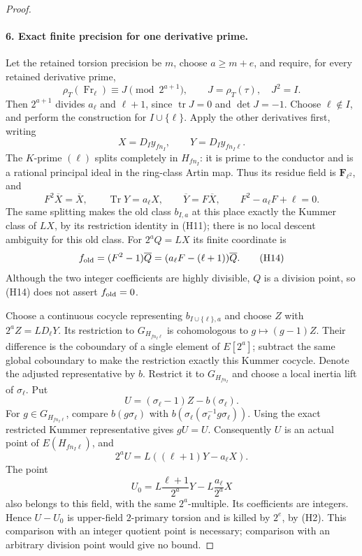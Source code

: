 \documentclass[11pt]{article}
\theoremstyle{definition}
\theoremstyle{remark}
\begin{document}
\begin{proof}
\paragraph{6. Exact finite precision for one derivative prime.}
Let the retained torsion precision be $m$, choose $a\ge m+e$,
and require, for every retained derivative prime,
\[
 \rho_T(\operatorname{Fr}_\ell)\equiv J\pmod {2^{a+1}},
 \qquad J=\rho_T(\tau),\quad J^2=I.                    \tag{H12}
\]
Then $2^{a+1}$ divides $a_\ell$ and $\ell+1$, since
$\operatorname{tr}J=0$ and $\det J=-1$.
Choose $\ell\notin I$, and perform the construction for
$I\cup\{\ell\}$. Apply the other derivatives first, writing
\[
 X=D_Iy_{fn_I},\qquad Y=D_Iy_{fn_I\ell}.
\]
The $K$-prime $(\ell)$ splits completely in $H_{fn_I}$:
it is prime to the conductor and is a rational principal ideal
in the ring-class Artin map. Thus its residue field is
$\mathbf F_{\ell^2}$, and
\[
 F^2\overline X=\overline X,\qquad
 \operatorname{Tr}Y=a_\ell X,\qquad
 \overline Y=F\overline X,\qquad F^2-a_\ell F+\ell=0.  \tag{H13}
\]
The same splitting makes the old class $b_{I,a}$ at this place
exactly the Kummer class of $LX$, by its restriction identity
in (H11); there is no local descent ambiguity for this old class.
For $2^aQ=LX$ its finite coordinate is
\[
 f_{\rm old}=(F^2-1)\overline Q
             =(a_\ell F-(\ell+1))\overline Q.           \tag{H14}
\]
Although the two integer coefficients are highly divisible, $Q$
is a division point, so (H14) does not assert $f_{\rm old}=0$.

Choose a continuous cocycle representing $b_{I\cup\{\ell\},a}$
and choose $Z$ with $2^a Z=LD_\ell Y$.
Its restriction to $G_{H_{fn_I\ell}}$ is cohomologous to
$g\mapsto(g-1)Z$. Their difference is the coboundary of a single
element of $E[2^a]$; subtract the same global coboundary to make
the restriction exactly this Kummer cocycle. Denote the adjusted
representative by $b$. Restrict it to $G_{H_{fn_I}}$ and choose
a local inertia lift of $\sigma_\ell$. Put
\[
                         U=(\sigma_\ell-1)Z-b(\sigma_\ell).
\]
For $g\in G_{H_{fn_I\ell}}$, compare $b(g\sigma_\ell)$ with
$b(\sigma_\ell(\sigma_\ell^{-1}g\sigma_\ell))$.
Using the exact restricted Kummer representative gives $gU=U$.
Consequently $U$ is an actual point of $E(H_{fn_I\ell})$, and
\[
 2^aU=L((\ell+1)Y-a_\ell X).
\]
The point
\[
 U_0=L\frac{\ell+1}{2^a}Y-L\frac{a_\ell}{2^a}X        \tag{H15}
\]
also belongs to this field, with the same $2^a$-multiple. Its
coefficients are integers. Hence $U-U_0$ is upper-field
$2$-primary torsion and is killed by $2^e$, by (H2).
This comparison with an integer quotient point is necessary;
comparison with an arbitrary division point would give no bound.


\end{proof}
\end{document}
